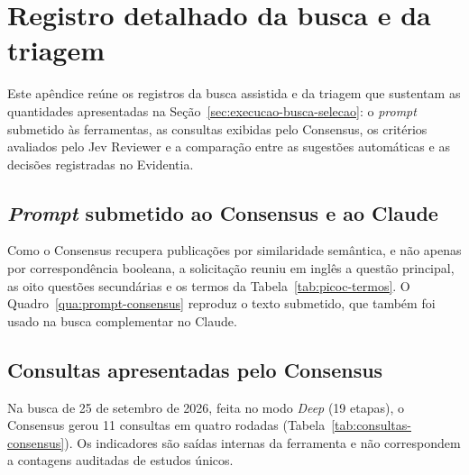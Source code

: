 \chapter{Registro detalhado da busca e da triagem}
\label{apend:registro-busca}

Este apêndice reúne os registros da busca assistida e da triagem que
sustentam as quantidades apresentadas na Seção~\ref{sec:execucao-busca-selecao}:
o \textit{prompt} submetido às ferramentas, as consultas exibidas pelo
Consensus, os critérios avaliados pelo Jev Reviewer e a comparação entre
as sugestões automáticas e as decisões registradas no Evidentia.

\section{\textit{Prompt} submetido ao Consensus e ao Claude}

Como o Consensus recupera publicações por similaridade semântica, e não
apenas por correspondência booleana, a solicitação reuniu em inglês a
questão principal, as oito questões secundárias e os termos da
Tabela~\ref{tab:picoc-termos}. O Quadro~\ref{qua:prompt-consensus}
reproduz o texto submetido, que também foi usado na busca complementar
no Claude.


\vspace{-0.2cm}\vspace{0.4cm}

\section{Consultas apresentadas pelo Consensus}

Na busca de 25 de setembro de 2026, feita no modo \textit{Deep} (19
etapas), o Consensus gerou 11 consultas em quatro rodadas
(Tabela~\ref{tab:consultas-consensus}). Os indicadores são saídas internas
da ferramenta e não correspondem a contagens auditadas de estudos únicos.

